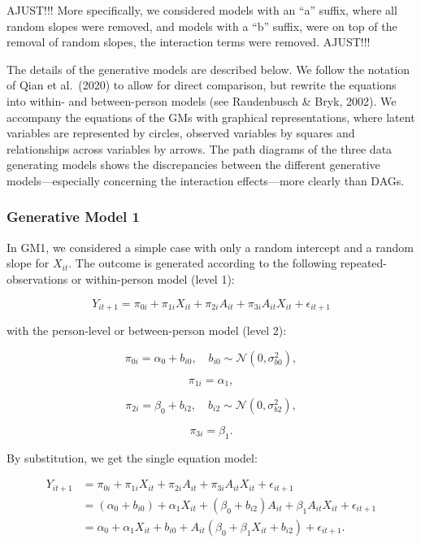 \documentclass[
  12pt,
  a4paper,
]{article}
\begin{document}
AJUST!!! More specifically, we considered models with an ``a'' suffix,
where all random slopes were removed, and models with a ``b'' suffix,
were on top of the removal of random slopes, the interaction terms were
removed. AJUST!!!

The details of the generative models are described below. We follow the
notation of Qian et al.~(2020) to allow for direct comparison, but
rewrite the equations into within- and between-person models (see
Raudenbusch \& Bryk, 2002). We accompany the equations of the GMs with
graphical representations, where latent variables are represented by
circles, observed variables by squares and relationships across
variables by arrows. The path diagrams of the three data generating
models shows the discrepancies between the different generative
models---especially concerning the interaction effects---more clearly
than DAGs.

\subsubsection{Generative Model 1}\label{generative-model-1}

In GM1, we considered a simple case with only a random intercept and a
random slope for \(X_{it}\). The outcome is generated according to the
following repeated-observations or within-person model (level 1):

\[
Y_{it+1} = \pi_{0i} + \pi_{1i} X_{it} + \pi_{2i} A_{it} + \pi_{3i} A_{it} X_{it} + \epsilon_{it+1}
\]

with the person-level or between-person model (level 2):

\[
\pi_{0i} = \alpha_0 + b_{i0}, \quad b_{i0} \sim \mathcal{N}(0, \sigma_{b0}^2),
\]

\[
\pi_{1i} = \alpha_1,
\]

\[
\pi_{2i} = \beta_0 + b_{i2}, \quad b_{i2} \sim \mathcal{N}(0, \sigma_{b2}^2),
\]

\[
\pi_{3i} = \beta_1.
\]

By substitution, we get the single equation model:

\[
\begin{aligned}
Y_{it+1} &= \pi_{0i} + \pi_{1i} X_{it} + \pi_{2i} A_{it} + \pi_{3i} A_{it} X_{it} + \epsilon_{it+1} \\
&= (\alpha_0 + b_{i0}) + \alpha_1 X_{it} + (\beta_0 + b_{i2}) A_{it} + \beta_1 A_{it} X_{it} + \epsilon_{it+1} \\
&= \alpha_0 + \alpha_1 X_{it} + b_{i0} + A_{it} (\beta_0 + \beta_1 X_{it} + b_{i2}) + \epsilon_{it+1}.
\end{aligned}
\]
\end{document}
